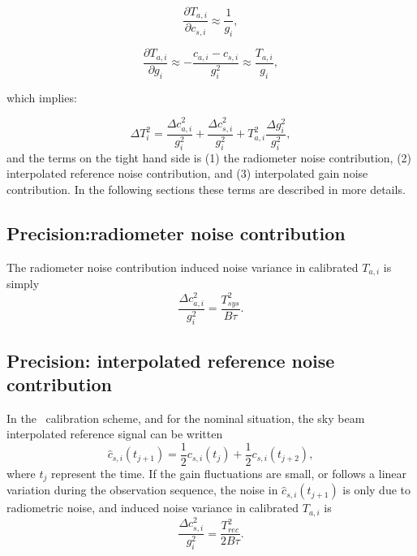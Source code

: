 \begin{equation}
\frac{\partial T_{a,i}}{\partial c_{s,i}} \approx \frac{1}{g_i}, 
\end{equation}

\begin{equation}
\frac{\partial T_{a,i}}{\partial g_{i}} \approx -\frac{c_{a,i}-c_{s,i}}{g_{i}^{2}} \approx \frac{T_{a,i}}{g_i}, 
\end{equation}

which implies:

\begin{equation}
\Delta T_{i}^{2} = \frac{\Delta c_{a,i}^{2}}{g_{i}^2} + \frac{\Delta c_{s,i}^{2}}{g_{i}^2} + T_{a,i}^{2}\frac{\Delta g_{i}^{2}}{g_{i}^2},
\end{equation}
and the terms on the tight hand side is (1) the radiometer noise contribution,
(2) interpolated reference noise contribution, and (3) interpolated gain noise contribution.  
In the following sections these terms are described in more details.

\subsection*{Precision:radiometer noise contribution}
The radiometer noise contribution induced noise variance in calibrated \(T_{a,i}\) is simply
\begin{equation}
\frac{\Delta c_{a,i}^{2}}{g_{i}^2} = \frac{T_{sys}^{2}}{B\tau}.
\end{equation}



\subsection*{Precision: interpolated reference noise contribution}
In the \smr\ calibration scheme, and for the nominal situation, the sky beam interpolated
reference signal can be written
\begin{equation}
\hat{c}_{s,i}(t_{j+1}) = \frac{1}{2}c_{s,i}(t_{j}) + \frac{1}{2}c_{s,i}(t_{j+2}), 
\end{equation}
where \(t_{j}\) represent the time.  
If the gain fluctuations are small, or follows a linear variation during the
observation sequence, the noise in \(\hat{c}_{s,i}(t_{j+1})\) is only due to radiometric
noise, and induced noise variance in calibrated \(T_{a,i}\) is
\begin{equation}
\frac{\Delta c_{s,i}^{2}}{g_{i}^2} = \frac{T_{rec}^{2}}{2B\tau}.
\end{equation}


